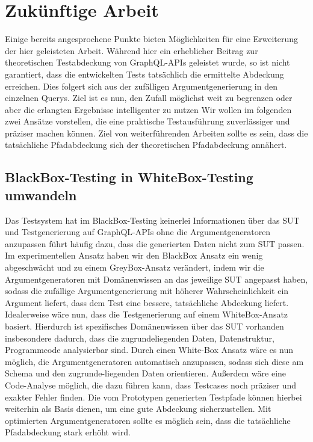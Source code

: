 \chapter{Zukünftige Arbeit}
\label{futurework}

Einige bereits angesprochene Punkte bieten Möglichkeiten für eine Erweiterung der hier geleisteten Arbeit.
Während hier ein erheblicher Beitrag zur theoretischen Testabdeckung von GraphQL-APIs geleistet wurde,
so ist nicht garantiert, dass die entwickelten Tests tatsächlich die ermittelte Abdeckung erreichen.
Dies folgert sich aus der zufälligen Argumentgenerierung in den einzelnen Querys.
Ziel ist es nun, den Zufall möglichst weit zu begrenzen oder aber die erlangten Ergebnisse intelligenter zu nutzen
Wir wollen im folgenden zwei Ansätze vorstellen, die eine praktische Testausführung zuverlässiger und präziser machen können.
Ziel von weiterführenden Arbeiten sollte es sein, dass die tatsächliche Pfadabdeckung sich der theoretischen Pfadabdeckung annähert.

\section{BlackBox-Testing in WhiteBox-Testing umwandeln}

Das Testsystem hat im BlackBox-Testing keinerlei Informationen über das SUT und Testgenerierung auf GraphQL-APIs ohne die Argumentgeneratoren anzupassen
führt häufig dazu, dass die generierten Daten nicht zum SUT passen.
Im experimentellen Ansatz haben wir den BlackBox Ansatz ein wenig abgeschwächt und zu einem GreyBox-Ansatz verändert, indem wir
die Argumentgeneratoren mit Domänenwissen an das jeweilige SUT angepasst haben, sodass die zufällige Argumentgenerierung mit höherer Wahrscheinlichkeit
ein Argument liefert, dass dem Test eine bessere, tatsächliche Abdeckung liefert.
Idealerweise wäre nun, dass die Testgenerierung auf einem WhiteBox-Ansatz basiert.
Hierdurch ist spezifisches Domänenwissen über das SUT vorhanden insbesondere dadurch, dass die zugrundeliegenden Daten, Datenstruktur, Programmcode analysierbar sind.
Durch einen White-Box Ansatz wäre es nun möglich, die Argumentgeneratoren automatisch anzupassen, sodass sich diese am Schema und den zugrunde-liegenden Daten orientieren.
Außerdem wäre eine Code-Analyse möglich, die dazu führen kann, dass Testcases noch präziser und exakter Fehler finden.
Die vom Prototypen generierten Testpfade können hierbei weiterhin als Basis dienen, um eine gute Abdeckung sicherzustellen.
Mit optimierten Argumentgeneratoren sollte es möglich sein, dass die tatsächliche Pfadabdeckung stark erhöht wird.

